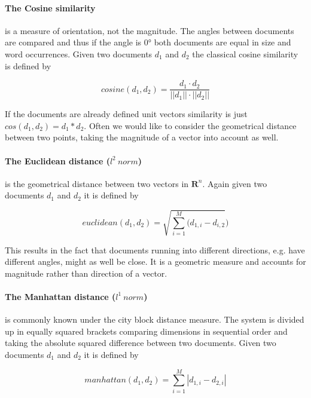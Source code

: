     \paragraph{The Cosine similarity} is a measure of orientation, not the magnitude. The angles between documents are compared and thus if the angle is $0°$ both documents are equal in size and word occurrences. Given two documents $d_1$ and $d_2$ the classical cosine similarity is defined by

    \begin{equation}
      cosine(d_1, d_2) = \frac{d_1 \cdot d_2}{||d_1|| \cdot ||d_2||}
    \end{equation}

    If the documents are already defined unit vectors \cosine{} similarity is just $cos(d_1, d_2) = d_1 * d_2$. Often we would like to consider the geometrical distance between two points, taking the magnitude of a vector into account as well.

    \paragraph{The Euclidean distance ($l^2\:norm$)} is the geometrical distance between two vectors in $\mathbf{R}^n$. Again given two documents $d_1$ and $d_2$ it is defined by

    \begin{equation}
      euclidean(d_1, d_2) = \sqrt{\sum_{i=1}^{M}(d_{1,i} - d_{i, 2}})
    \end{equation}

    This results in the fact that documents running into different directions, e.g. have different angles, might as well be close. It is a geometric measure and accounts for magnitude rather than direction of a vector.

    \paragraph{The Manhattan distance ($l^1\:norm$)} is commonly known under the city block distance measure. The system is divided up in equally squared brackets comparing dimensions in sequential order and taking the absolute squared difference between two documents. Given two documents $d_1$ and $d_2$ it is defined by

    \begin{equation}
      manhattan(d_1, d_2) = \sum_{i=1}^{M}|d_{1,i} - d_{2,i}|
    \end{equation}

